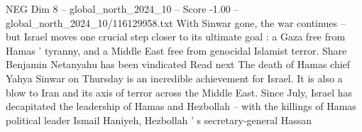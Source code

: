 \begin{textsample}{NEG Dim 8 – global\_north\_2024\_10 – Score -1.00 – global\_north\_2024\_10/116129958.txt}
With Sinwar gone, the war continues -- but Israel moves one crucial step closer to its ultimate goal : a Gaza free from Hamas ' tyranny, and a Middle East free from genocidal Islamist terror.
Share Benjamin Netanyahu has been vindicated Read next The death of Hamas chief Yahya Sinwar on Thursday is an incredible achievement for Israel.
It is also a blow to Iran and its axis of terror across the Middle East.
Since July, Israel has decapitated the leadership of Hamas and Hezbollah -- with the killings of Hamas political leader Ismail Haniyeh, Hezbollah ' s secretary-general Hassan

\end{textsample}
